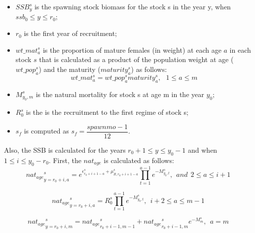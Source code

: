 \documentclass{article}
\begin{document}
\begin{itemize}
  
   \item $SSB^s_y$ is the spawning stock biomass for the stock s in the year y, when  $ssb_0\leq y \leq r_0$;
   
   \item $r_0$ is the first year of recruitment;
   
   \item $wt\_{mat}^s_a$ is the proportion of mature females (in weight) at each age $a$ in each stock $s$ that is calculated as a product of the population weight at age ($wt\_pop^s_a$) and the maturity ($maturity^s_a$) as follows:
    \begin{equation}
        wt\_{mat}^s_a=wt\_pop^s_a maturity^s_a, \ \ \ 1\leq a \leq m 
    \end{equation}
        
    \item $M^s_{y_0,m}$ is the natural mortality for stock s at age m in the year $y_0$;
    
    \item $R^s_{0}$ is the is the recruitment to the first regime of stock s;

    \item $s_f$ is computed as $s_f=\dfrac{spawnmo-1}{12}$.

\end{itemize}

\hfill

Also, the SSB is calculated for the years $r_0+1 \leq y \leq y_0 - 1$ and when $1\leq i \leq y_0-r_0$. First, the $nat_{age}$ is calculated as follows:\\

\begin{equation}
{nat_{age}}_{y=r_0+i,a}^s= e^{\epsilon^s_{r_0+i+1-a}+\mu^s_{R,r_0+i+1-a}}\prod_{t=1}^{a-1}e^{-M^s_{y_0,t}}, \ \ and \ \ 2\leq a \leq i+1
\end{equation}

\begin{equation}
{nat_{age}}_{y=r_0+i,a}^s=R^s_0\prod_{t=1}^{a-1}e^{-M^s_{y_0,t}}, \ \ i+2\leq  a \leq m-1
\end{equation}

\begin{equation}
{nat_{age}}_{y=r_0+i,m}^s={nat_{age}}_{r_0+i-1,m-1}^s
+{nat_{age}}_{r_0+i-1,m}^s e^{-M^s_{m}}, \ \ a=m
\end{equation}
\end{document}
